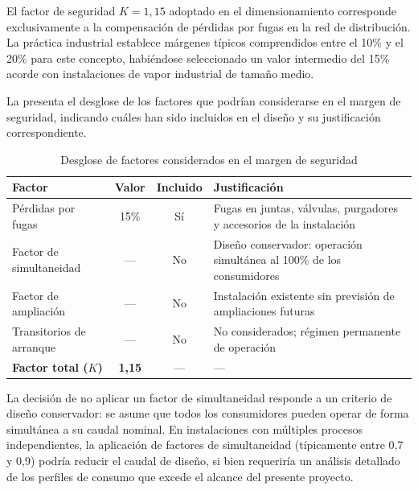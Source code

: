 El factor de seguridad $K = 1{,}15$ adoptado en el dimensionamiento corresponde exclusivamente a la compensación de pérdidas por fugas en la red de distribución. La práctica industrial establece márgenes típicos comprendidos entre el 10\% y el 20\% para este concepto, habiéndose seleccionado un valor intermedio del 15\% acorde con instalaciones de vapor industrial de tamaño medio.

La  presenta el desglose de los factores que podrían considerarse en el margen de seguridad, indicando cuáles han sido incluidos en el diseño y su justificación correspondiente.

\begin{table}[H]
	\centering
	\caption{Desglose de factores considerados en el margen de seguridad}
	\label{tab:desglose-factor-seguridad}
	\begin{tabular}{lccp{5.5cm}}
		\toprule
		\textbf{Factor}             & \textbf{Valor} & \textbf{Incluido} & \textbf{Justificación}                                                \\
		\midrule
		Pérdidas por fugas          & 15\%           & Sí                & Fugas en juntas, válvulas, purgadores y accesorios de la instalación  \\
		Factor de simultaneidad     & ---            & No                & Diseño conservador: operación simultánea al 100\% de los consumidores \\
		Factor de ampliación        & ---            & No                & Instalación existente sin previsión de ampliaciones futuras           \\
		Transitorios de arranque    & ---            & No                & No considerados; régimen permanente de operación                      \\
		\midrule
		\textbf{Factor total ($K$)} & \textbf{1,15}  & ---               & ---                                                                   \\
		\bottomrule
	\end{tabular}
\end{table}

La decisión de no aplicar un factor de simultaneidad responde a un criterio de diseño conservador: se asume que todos los consumidores pueden operar de forma simultánea a su caudal nominal. En instalaciones con múltiples procesos independientes, la aplicación de factores de simultaneidad (típicamente entre 0,7 y 0,9) podría reducir el caudal de diseño, si bien requeriría un análisis detallado de los perfiles de consumo que excede el alcance del presente proyecto.

